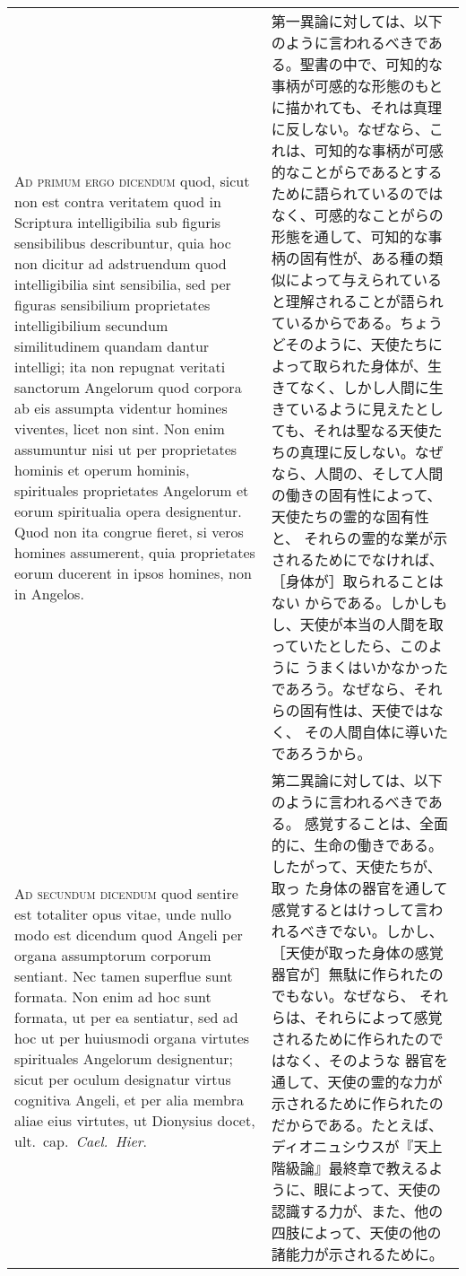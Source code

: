 \documentclass[10pt]{jsarticle} %
\begin{document}
\begin{longtable}{p{21em}p{21em}}
{\scshape Ad primum ergo dicendum} quod, sicut non est
contra veritatem quod in Scriptura intelligibilia sub figuris
sensibilibus describuntur, quia hoc non dicitur ad adstruendum quod
intelligibilia sint sensibilia, sed per figuras sensibilium proprietates
intelligibilium secundum similitudinem quandam dantur intelligi; ita non
repugnat veritati sanctorum Angelorum quod corpora ab eis assumpta
videntur homines viventes, licet non sint. Non enim assumuntur nisi ut
per proprietates hominis et operum hominis, spirituales proprietates
Angelorum et eorum spiritualia opera designentur. Quod non ita congrue
fieret, si veros homines assumerent, quia proprietates eorum ducerent in
ipsos homines, non in Angelos.

&

第一異論に対しては、以下のように言われるべきである。聖書の中で、可知的な
事柄が可感的な形態のもとに描かれても、それは真理に反しない。なぜなら、こ
れは、可知的な事柄が可感的なことがらであるとするために語られているのでは
なく、可感的なことがらの形態を通して、可知的な事柄の固有性が、ある種の類
似によって与えられていると理解されることが語られているからである。ちょう
どそのように、天使たちによって取られた身体が、生きてなく、しかし人間に生
きているように見えたとしても、それは聖なる天使たちの真理に反しない。なぜ
なら、人間の、そして人間の働きの固有性によって、天使たちの霊的な固有性と、
それらの霊的な業が示されるためにでなければ、［身体が］取られることはない
からである。しかしもし、天使が本当の人間を取っていたとしたら、このように
うまくはいかなかったであろう。なぜなら、それらの固有性は、天使ではなく、
その人間自体に導いたであろうから。


\\



{\scshape Ad secundum dicendum} quod sentire est
totaliter opus vitae, unde nullo modo est dicendum quod Angeli per
organa assumptorum corporum sentiant. Nec tamen superflue sunt
formata. Non enim ad hoc sunt formata, ut per ea sentiatur, sed ad hoc
ut per huiusmodi organa virtutes spirituales Angelorum designentur;
sicut per oculum designatur virtus cognitiva Angeli, et per alia membra
aliae eius virtutes, ut Dionysius docet, ult.~cap.~{\itshape Cael.~Hier}.

&

第二異論に対しては、以下のように言われるべきである。
感覚することは、全面的に、生命の働きである。したがって、天使たちが、取っ
 た身体の器官を通して感覚するとはけっして言われるべきでない。しかし、
 ［天使が取った身体の感覚器官が］無駄に作られたのでもない。なぜなら、
 それらは、それらによって感覚されるために作られたのではなく、そのような
 器官を通して、天使の霊的な力が示されるために作られたのだからである。たとえば、
ディオニュシウスが『天上階級論』最終章で教えるように、眼によって、天使の認識する力が、また、他の四肢によって、天使の他の諸能力が示されるために。



\end{longtable}
\end{document}
